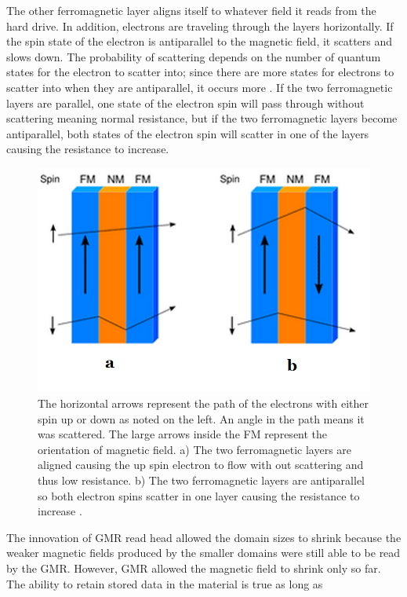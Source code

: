 \documentclass[ notitlepage, numerical, 11pt]{revtex4-1} %
\begin{document}
The other ferromagnetic layer aligns itself to whatever field it reads from the hard drive. In addition, electrons are traveling through the layers horizontally. If the spin state of the electron is antiparallel to the magnetic field, it scatters and slows down. The probability of scattering depends on the number of quantum states for the electron to scatter into; since there are more states for electrons to scatter into when they are antiparallel, it occurs more \cite{gmr}. If the two ferromagnetic layers are parallel, one state of the electron spin will pass through without scattering meaning normal resistance, but if the two ferromagnetic layers become antiparallel, both states of the electron spin will scatter in one of the layers causing the resistance to increase.
\begin{figure}[H]
\centerline{\includegraphics[scale=.55]{gmr2.png}}
\caption{The horizontal arrows represent the path of the electrons with either spin up or down as noted on the left. An angle in the path means it was scattered. The large arrows inside the FM represent the orientation of magnetic field. a) The two ferromagnetic layers are aligned causing the up spin electron to flow with out scattering and thus low resistance. b) The two ferromagnetic layers are antiparallel so both electron spins scatter in one layer causing the resistance to increase \cite{gmr}.}
\label{gmr2}
\end{figure}
The innovation of GMR read head allowed the domain sizes to shrink because the weaker magnetic fields produced by the smaller domains were still able to be read by the GMR. However, GMR allowed the magnetic field to shrink only so far. 
The ability to retain stored data in the material is true as long as 
\end{document}
